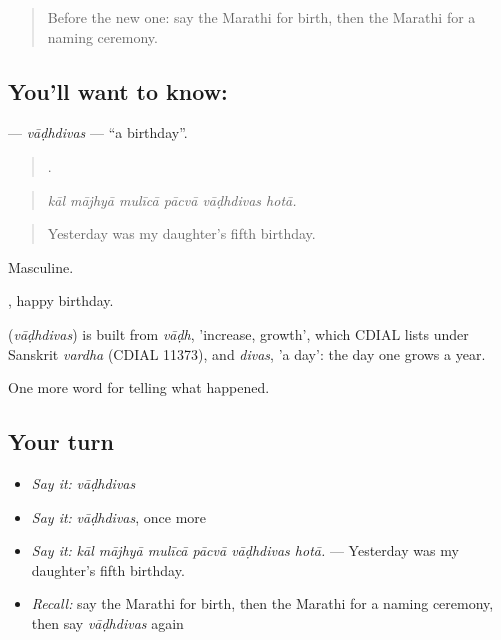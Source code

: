 \label{lesson:MR-C318-vadhdivas}



\begin{quote}
Before the new one: say the Marathi for birth, then the Marathi for a naming ceremony.
\end{quote}

\subsection*{You'll want to know: }
\textbf{} — \emph{vāḍhdivas} — \textquotedblleft{}a birthday\textquotedblright{}.

\begin{quote}
     .
\end{quote}

\begin{quote}
\emph{kāl mājhyā mulīcā pācvā vāḍhdivas hotā.}
\end{quote}

\begin{quote}
Yesterday was my daughter's fifth birthday.
\end{quote}

Masculine.

 , happy birthday.

\begin{cousinweb}
\textbf{} (\emph{vāḍhdivas}) is built from \emph{vāḍh}, 'increase, growth', which CDIAL lists under Sanskrit \emph{vardha} (CDIAL 11373), and \emph{divas}, 'a day': the day one grows a year.
\end{cousinweb}

\begin{grammarlens}[title={What you've built}]
One more word for telling what happened.
\end{grammarlens}

\subsection*{Your turn}
\begin{itemize}
\raggedright
  \item \emph{Say it:} \emph{vāḍhdivas}
  \item \emph{Say it:} \emph{vāḍhdivas}, once more
  \item \emph{Say it:} \emph{kāl mājhyā mulīcā pācvā vāḍhdivas hotā.} — Yesterday was my daughter's fifth birthday.
  \item \emph{Recall:} say the Marathi for birth, then the Marathi for a naming ceremony, then say \emph{vāḍhdivas} again
\end{itemize}

